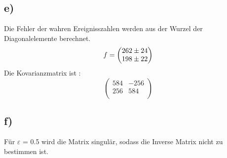 \subsection*{e)}
Die Fehler der wahren Ereignisszahlen werden aus der Wurzel der Diagonalelemente berechnet.
\begin{equation}
  f = \begin{pmatrix}
    \num{262 +- 24}\\
    \num{198 +- 22}\\
    \end{pmatrix}
\end{equation}
Die Kovarianzmatrix ist :
\begin{equation}
  \begin{pmatrix}
    584 & -256 \\
    256 & 584 \\
  \end{pmatrix}
\end{equation}

\subsection*{f)}
Für $\varepsilon$ = 0.5 wird die Matrix singulär, sodass die Inverse Matrix nicht zu bestimmen ist.
